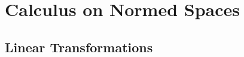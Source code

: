 \documentclass[crop=false,class=article,oneside]{standalone}
\begin{document}
    \ifx\ifsub\undefined
        \section*{Calculus on Normed Spaces}
        \setcounter{section}{1}
    \fi
    \subsection{Linear Transformations}
\end{document}
